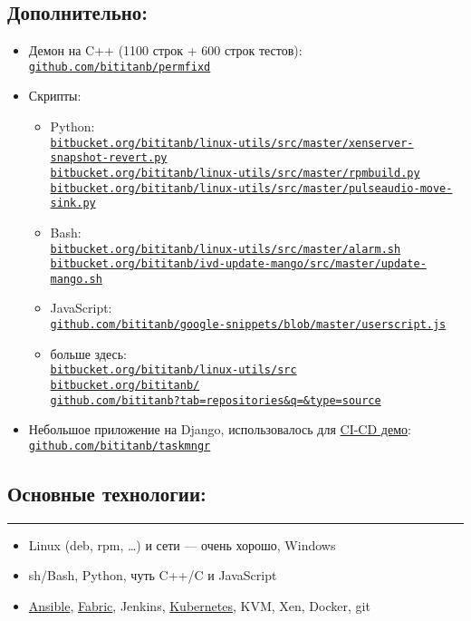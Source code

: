 \documentclass[11pt, a4paper]{article}
\newcommand{\Delimitline}{
  \vspace{-4ex}
  \textcolor[RGB]{120,120,120}{\rule{\linewidth}{1pt}}
  \vspace{-4ex}
}
\newcommand\rurl[1]{%
  \href{http://#1}{\nolinkurl{#1}}%
}
\begin{document}
\subsection*{Дополнительно:}
\begin{itemize}
  \item Демон на C++ (1100 строк + 600 строк тестов):\\
    \rurl{github.com/bititanb/permfixd}
  \item Скрипты:
    \begin{itemize}
      \item Python:\\
        \rurl{bitbucket.org/bititanb/linux-utils/src/master/xenserver-snapshot-revert.py}\\
        \rurl{bitbucket.org/bititanb/linux-utils/src/master/rpmbuild.py}\\
        \rurl{bitbucket.org/bititanb/linux-utils/src/master/pulseaudio-move-sink.py}
      \item Bash:\\
        \rurl{bitbucket.org/bititanb/linux-utils/src/master/alarm.sh}\\
        \rurl{bitbucket.org/bititanb/ivd-update-mango/src/master/update-mango.sh}
      \item JavaScript:\\
        \rurl{github.com/bititanb/google-snippets/blob/master/userscript.js}
      \item больше здесь:\\
        \rurl{bitbucket.org/bititanb/linux-utils/src}\\
        \rurl{bitbucket.org/bititanb/}\\
        \rurl{github.com/bititanb?tab=repositories&q=&type=source}
    \end{itemize}
  \item Небольшое приложение на Django, использовалось для \href{https://github.com/bititanb/CI-CD-pipeline}{CI-CD демо}:\\
    \rurl{github.com/bititanb/taskmngr}
\end{itemize}

\subsection*{Основные технологии:}
\Delimitline
\begin{itemize}
  \item Linux (deb, rpm, \dots) и сети — очень хорошо, Windows
  \item sh/Bash, Python, чуть C++/C и JavaScript
  \item \href{https://github.com/bititanb/ansible-taskmngr}{Ansible}, \href{https://bitbucket.org/bititanb/ivd-fabric/src}{Fabric}, Jenkins, \href{https://github.com/bititanb/ansible-taskmngr/tree/master/roles/taskmngr-kubernetes/templates}{Kubernetes}, KVM, Xen, Docker, git\par
\end{itemize}
\end{document}
